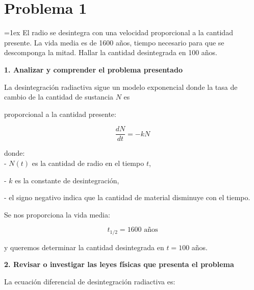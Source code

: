 \documentclass[answers]{exam}
\edef\svparindent{\the\parindent}
\newenvironment{specindent}
  {\par\everypar{\leftskip=\svparindent\relax}\parindent=0pt\relax\parskip=1ex}
  {\vspace{\parskip}\par}
\begin{document}
\section*{Problema 1}

\begin{specindent}
	El radio se desintegra con una velocidad proporcional a la cantidad presente. La vida media es de 1600 años, tiempo necesario para que se descomponga la mitad. Hallar la cantidad desintegrada en 100 años.

\end{specindent}
\vspace{0.5em}

\textbf{1. Analizar y comprender el problema presentado}

La desintegración radiactiva sigue un modelo exponencial donde la tasa de cambio de la cantidad de sustancia \( N \) es

proporcional a la cantidad presente:


\[
	\frac{dN}{dt} = -kN
\]

donde: \\

- \( N(t) \) es la cantidad de radio en el tiempo \( t \),

- \( k \) es la constante de desintegración,

- el signo negativo indica que la cantidad de material disminuye con el tiempo.

Se nos proporciona la vida media:

\[
	t_{1/2} = 1600 \text{ años}
\]

y queremos determinar la cantidad desintegrada en \( t = 100 \) años.

\vspace{0.3cm}
\textbf{2. Revisar o investigar las leyes físicas que presenta el problema}

La ecuación diferencial de desintegración radiactiva es:
\end{document}
